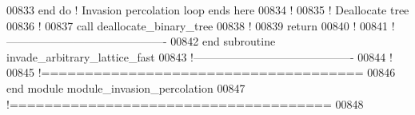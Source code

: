 \begin{DoxyCode}
00833     \textcolor{keyword}{end do} \textcolor{comment}{! Invasion percolation loop ends here}
00834     \textcolor{comment}{!}
00835     \textcolor{comment}{! Deallocate tree}
00836     \textcolor{comment}{!}
00837     call deallocate\_binary\_tree
00838     \textcolor{comment}{!}
00839     return
00840     \textcolor{comment}{!}
00841   \textcolor{comment}{!-------------------------------------------}
00842 \textcolor{keyword}{  end subroutine invade\_arbitrary\_lattice\_fast}
00843   \textcolor{comment}{!-------------------------------------------}
00844   \textcolor{comment}{!}
00845 \textcolor{comment}{!=====================================}
00846 \textcolor{keyword}{end module module\_invasion\_percolation}
00847 \textcolor{comment}{!=====================================}
00848 
\end{DoxyCode}
